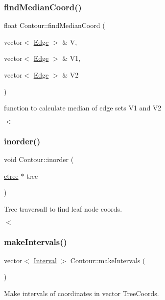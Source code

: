 \subsubsection{\texorpdfstring{find\+Median\+Coord()}{findMedianCoord()}}
{\footnotesize\ttfamily float Contour\+::find\+Median\+Coord (\begin{DoxyParamCaption}\item[{vector$<$ \hyperlink{classEdge}{Edge} $>$ \&}]{V,  }\item[{vector$<$ \hyperlink{classEdge}{Edge} $>$ \&}]{V1,  }\item[{vector$<$ \hyperlink{classEdge}{Edge} $>$ \&}]{V2 }\end{DoxyParamCaption})}



function to calculate median of edge sets V1 and V2 

$<$ \mbox{\label{classContour_acb911b734ef67fa1ce24ca437da7fc91}} 
\subsubsection{\texorpdfstring{inorder()}{inorder()}}
{\footnotesize\ttfamily void Contour\+::inorder (\begin{DoxyParamCaption}\item[{\hyperlink{classctree}{ctree} $\ast$}]{tree }\end{DoxyParamCaption})}



Tree traversall to find leaf node coords. 

$<$ \mbox{\label{classContour_a2b90717194f2c6a7506b7981302cfbcc}} 
\subsubsection{\texorpdfstring{make\+Intervals()}{makeIntervals()}}
{\footnotesize\ttfamily vector$<$ \hyperlink{classInterval}{Interval} $>$ Contour\+::make\+Intervals (\begin{DoxyParamCaption}{ }\end{DoxyParamCaption})}



Make intervals of coordinates in vector Tree\+Coords. 

